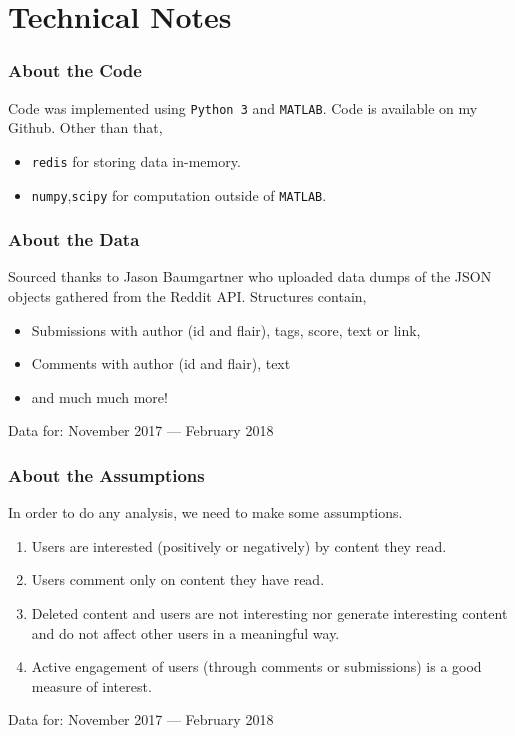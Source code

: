 \documentclass[frame number]{beamer}
\begin{document}
\section{Technical Notes}
\begin{frame}
  \frametitle{About the Code}
  Code was implemented using \texttt{Python 3} and \texttt{MATLAB}. Code is available on my Github. Other than that,
  \begin{itemize}
    \item \texttt{redis} for storing data in-memory.
    \item \texttt{numpy},\texttt{scipy} for computation outside of \texttt{MATLAB}.
  \end{itemize}
\end{frame}
\begin{frame}
  \frametitle{About the Data}
  Sourced thanks to Jason Baumgartner who uploaded data dumps of the JSON objects gathered from the Reddit API. Structures contain,
  \begin{itemize}
    \item{Submissions with author (id and flair), tags, score, text or link,}
    \item{Comments with author (id and flair), text}
    \item{and much much more!}
  \end{itemize}
  \pause
  Data for: November 2017 --- February 2018
\end{frame}
\begin{frame}
  \frametitle{About the Assumptions}
  In order to do any analysis, we need to make some assumptions.
  \begin{enumerate}
    \item<1->{Users are interested (positively or negatively) by content they read.}
    \item<2->{Users comment only on content they have read.}
    \item<3->{Deleted content and users are not interesting nor generate interesting content and do not affect other users in a meaningful way.}
    \item<4->{Active engagement of users (through comments or submissions) is a good measure of interest.}
  \end{enumerate}

  Data for: November 2017 --- February 2018
\end{frame}
\end{document}
